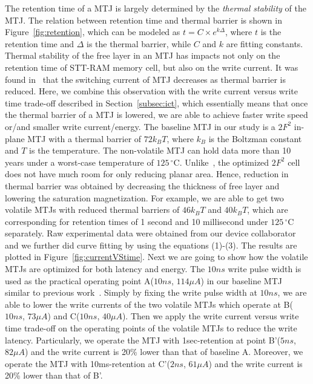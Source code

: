 The retention time of a MTJ is largely determined by the \textit{thermal stability} of the MTJ. The relation
between retention time and thermal barrier is shown in Figure~\ref{fig:retention}, which can be
modeled as $t=C\times e^{k\Delta}$, where $t$ is the retention time and $\Delta$ is the thermal
barrier, while $C$ and $k$ are fitting constants. Thermal stability of the free layer in an MTJ has impacts not
only on the retention time of STT-RAM memory cell, but also on the write current. It was found
in~\cite{PMTJ:Toshiba08} that the switching current of MTJ decreases as thermal barrier is reduced. Here, we combine this observation with the write current versus write time trade-off described in Section~\ref{subsec:ict}, which essentially means that once the thermal barrier of a MTJ is lowered, we are able to achieve faster write speed or/and smaller write current/energy. The baseline MTJ in our study is a $2F^2$ in-plane MTJ with a thermal barrier of $72k_{B}T$, where $k_{B}$ is the Boltzman constant and $T$ is the temperature. The non-volatile MTJ can hold data more than 10 years under a worst-case temperature of $125\,^{\circ}\mathrm{C}$. Unlike~\cite{STTRAM:HPCA11}, the optimized $2F^2$ cell does not have much room for only reducing planar area. Hence, reduction in thermal barrier was obtained by decreasing the thickness of free layer and lowering the saturation magnetization. For example, we are able to get two volatile MTJs with reduced thermal barriers of $46k_{B}T$ and $40k_{B}T$, which are corresponding for retention times of 1 second and 10 millisecond under $125\,^{\circ}\mathrm{C}$ separately. Raw experimental data were obtained from our device collaborator and we further did curve fitting by using the equations (1)-(3). The results are plotted in Figure~\ref{fig:currentVStime}. Next we are going to show how the volatile MTJs are optimized for both latency and energy. The $10ns$ write pulse width is used as the practical operating point A($10ns$, $114\mu A$) in our baseline MTJ similar to previous work~\cite{CACTI:DAC08:Dong}. Simply by fixing the write pulse width at $10ns$, we are able to lower the write currents of the two volatile MTJs which operate at B($10ns$, $73\mu A$) and C($10ns$, $40\mu A$). Then we apply the write current versus write time trade-off on the operating points of the volatile MTJs to reduce the write latency. Particularly, we operate the MTJ with 1sec-retention at point B'($5ns$, $82\mu A$) and the write current is 20\% lower than that of baseline A. Moreover, we operate the MTJ with 10ms-retention at C'($2ns$, $61\mu A$) and the write current is 20\% lower than that of B'.

